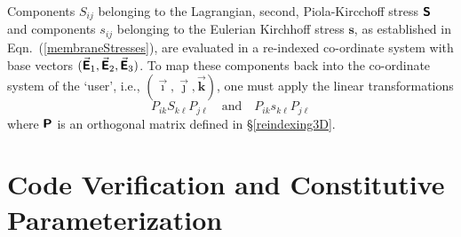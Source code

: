 Components $S_{ij}$ belonging to the Lagrangian, second, Piola-Kircchoff stress $\boldsymbol{\mathsf{S}}$ and components $s_{ij}$ belonging to the Eulerian Kirchhoff stress $\boldsymbol{s}$, as established in Eqn.~(\ref{membraneStresses}), are evaluated in a re-indexed co-ordinate system with base vectors $( \vec{\boldsymbol{\mathsf{E}}}_1 , \vec{\boldsymbol{\mathsf{E}}}_2 , \vec{\boldsymbol{\mathsf{E}}}_3 )$.  To map these components back into the co-ordinate system of the `user', i.e., $( \vec{\boldsymbol{\imath}} , \vec{\boldsymbol{\jmath}} , \vec{\boldsymbol{k}} )$, one must apply the linear transformations
\begin{displaymath}
P_{ik} S_{k\ell} P_{j\ell}
\quad \text{and} \quad
P_{ik} s_{k\ell} P_{j\ell} 
\end{displaymath}
where $\boldsymbol{\mathsf{P}}$ is an orthogonal matrix defined in \S\ref{reindexing3D}.

\section{Code Verification and Constitutive Parameterization}
\label{secCE_verifyCode}

